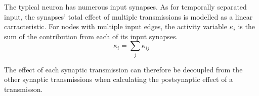 		The typical neuron has numerous input synapses. 
		As for temporally separated input, the synapses' total effect of multiple transmissions is modelled as a linear carracteristic. %
		For nodes with multiple input edges, the activity variable $\kappa_i$ is the sum of the contribution from each of its input synapses.
		\begin{equation}
			\kappa_i = \sum_j{\kappa_{ij}}
			\label{eqSumOfKij}
		\end{equation}

		The effect of each synaptic transmission can therefore be decoupled from the other synaptic transmissions when calculating the postsynaptic effect of a transmisson.






